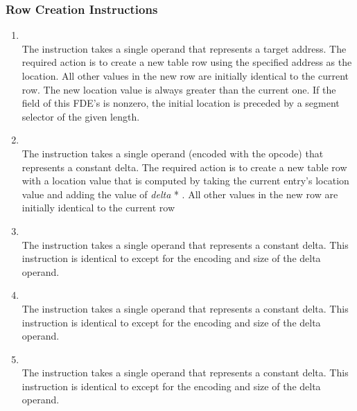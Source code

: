 \subsubsection{Row Creation Instructions}
\label{chap:rowcreationinstructions}
\begin{enumerate}[1. ]

\item \textbf{\DWCFAsetlocTARG} \\
The \DWCFAsetlocNAME{} instruction 
takes a single operand that
represents a target address. The required action is to create a
new table row using the specified address as the location. All
other values in the new row are initially identical to the
current row. The new location value is always greater than
the current one. 
If the \HFNsegmentselectorsize{} field of this FDE's 
is non\dash zero, the initial location is preceded by a segment
selector of the given length.

\item \textbf{\DWCFAadvancelocTARG} \\
The \DWCFAadvancelocNAME{} instruction takes a single operand (encoded
with the opcode) that represents a constant delta. The required
action is to create a new table row with a location value that
is computed by taking the current entry\textquoteright s location value
and adding the value of 
\textit{delta} * . 
All other values in the new row are initially identical to the
current row

\item \textbf{\DWCFAadvanceloconeTARG{}} \\
The \DWCFAadvanceloconeNAME{} instruction takes a single \HFTubyte{}
operand that represents a constant delta. This instruction
is identical to \DWCFAadvanceloc{} except for the encoding
and size of the delta operand.

\item \textbf{\DWCFAadvanceloctwoTARG} \\
The \DWCFAadvanceloctwoNAME{} instruction takes a single \HFTuhalf{}
operand that represents a constant delta. This instruction
is identical to \DWCFAadvanceloc{} except for the encoding
and size of the delta operand.

\item \textbf{\DWCFAadvancelocfourTARG} \\
The \DWCFAadvancelocfourNAME{} instruction takes a single \HFTuword{}
operand that represents a constant delta. This instruction
is identical to \DWCFAadvanceloc{} except for the encoding
and size of the delta operand.

\end{enumerate}

